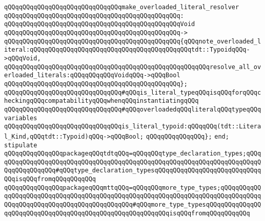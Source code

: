 \verb|qQQqqQQqqQQqqQQqqQQqqQQqqQQqqQQqmake_overloaded_literal_resolver|\newline
\verb|qQQqqQQqqQQqqQQqqQQqqQQqqQQqqQQqqQQqqQQqqQQqqQQq:|\newline
\verb|qQQqqQQqqQQqqQQqqQQqqQQqqQQqqQQqqQQqqQQqqQQqqQQqVoid|\newline
\verb|qQQqqQQqqQQqqQQqqQQqqQQqqQQqqQQqqQQqqQQqqQQqqQQq->|\newline
\verb|qQQqqQQqqQQqqQQqqQQqqQQqqQQqqQQqqQQqqQQqqQQqqQQq{qQQqnote_overloaded_literal:qQQqqQQqqQQqqQQqqQQqqQQqqQQqqQQqqQQqqQQqqQQqtdt::TypoidqQQq->qQQqVoid,|\newline
\verb|qQQqqQQqqQQqqQQqqQQqqQQqqQQqqQQqqQQqqQQqqQQqqQQqqQQqqQQqresolve_all_overloaded_literals:qQQqqQQqqQQqVoidqQQq->qQQqBool|\newline
\verb|qQQqqQQqqQQqqQQqqQQqqQQqqQQqqQQqqQQqqQQqqQQqqQQq};|\newline
\newline
\verb|qQQqqQQqqQQqqQQqqQQqqQQqqQQqqQQq#qQQqis_literal_typeqQQqisqQQqforqQQqcheckingqQQqcompatabilityqQQqwhenqQQqinstantiatingqQQq|\newline
\verb|qQQqqQQqqQQqqQQqqQQqqQQqqQQqqQQq#qQQqoverloadedqQQqliteralqQQqtypeqQQqvariables|\newline
\newline
\verb|qQQqqQQqqQQqqQQqqQQqqQQqqQQqqQQqis_literal_typoid:qQQqqQQq(tdt::Literal_Kind,qQQqtdt::Typoid)qQQq->qQQqBool;|\newline
\verb|qQQqqQQqqQQqqQQq};|\newline
\verb|end;|\newline
\newline
\verb|stipulate|\newline
\verb|qQQqqQQqqQQqqQQqpackageqQQqtdtqQQq=qQQqqQQqtype_declaration_types;qQQqqQQqqQQqqQQqqQQqqQQqqQQqqQQqqQQqqQQqqQQqqQQqqQQqqQQqqQQqqQQqqQQqqQQqqQQqqQQqqQQqqQQq#qQQqtype_declaration_typesqQQqqQQqqQQqqQQqqQQqqQQqqQQqqQQqisqQQqfromqQQqqQQqqQQq|\newline
\verb|qQQqqQQqqQQqqQQqpackageqQQqmttqQQq=qQQqqQQqmore_type_types;qQQqqQQqqQQqqQQqqQQqqQQqqQQqqQQqqQQqqQQqqQQqqQQqqQQqqQQqqQQqqQQqqQQqqQQqqQQqqQQqqQQqqQQqqQQqqQQqqQQqqQQqqQQqqQQqqQQq#qQQqmore_type_typesqQQqqQQqqQQqqQQqqQQqqQQqqQQqqQQqqQQqqQQqqQQqqQQqqQQqqQQqqQQqisqQQqfromqQQqqQQqqQQq|\newline
